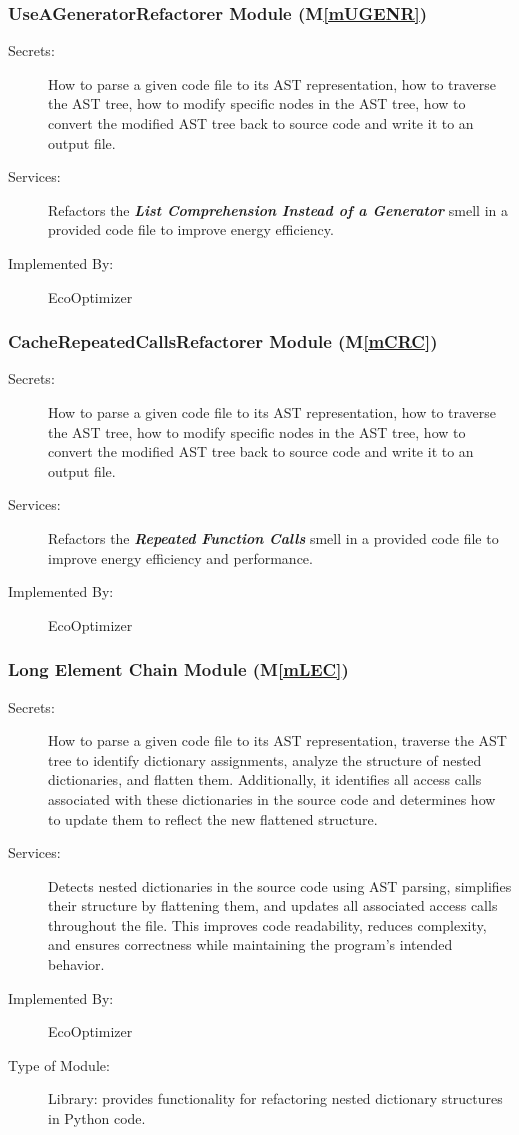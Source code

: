 \documentclass[12pt, titlepage]{article}
\newcommand{\mref}[1]{M\ref{#1}}
\begin{document}
\subsubsection{UseAGeneratorRefactorer Module (\mref{mUGENR})}
\begin{description}
    \item[Secrets:] How to parse a given code file to its AST representation, how to traverse the AST tree, how to modify specific nodes in the AST tree, how to convert the modified AST tree back to source code and write it to an output file.
    \item[Services:] Refactors the \textbf{\textit{List Comprehension Instead of a Generator}} smell in a provided code file to improve energy efficiency.
    \item[Implemented By:] EcoOptimizer
\end{description}

\subsubsection{CacheRepeatedCallsRefactorer Module (\mref{mCRC})}
\begin{description}
    \item[Secrets:] How to parse a given code file to its AST representation, how to traverse the AST tree, how to modify specific nodes in the AST tree, how to convert the modified AST tree back to source code and write it to an output file.
    \item[Services:] Refactors the \textbf{\textit{Repeated Function Calls}} smell in a provided code file to improve energy efficiency and performance.
    \item[Implemented By:] EcoOptimizer
\end{description}

\subsubsection{Long Element Chain Module (\mref{mLEC})}

\begin{description}
    \item[Secrets:] How to parse a given code file to its AST representation, traverse the 
    AST tree to identify dictionary assignments, analyze the structure of nested dictionaries,
     and flatten them. Additionally, it identifies all access calls associated with these dictionaries
      in the source code and determines how to update them to reflect the new flattened structure.
    \item[Services:] Detects nested dictionaries in the source code using AST parsing, simplifies their 
    structure by flattening them, and updates all associated access calls throughout the file. This improves 
    code readability, reduces complexity, and ensures correctness while maintaining the program's intended behavior.
    \item[Implemented By:] EcoOptimizer
    \item[Type of Module:] Library: provides functionality for refactoring nested dictionary structures in Python code.
\end{description}
\end{document}
